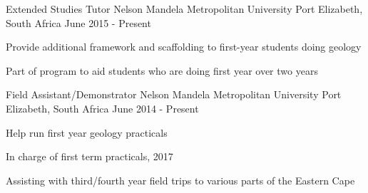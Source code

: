 


\begin{cventries}


\cventry
{Extended Studies Tutor} %
{Nelson Mandela Metropolitan University} %
{Port Elizabeth, South Africa} %
{June 2015 - Present} %
{ %
\begin{cvitems}
\item {Provide additional framework and scaffolding to first-year students doing geology}
\item {Part of program to aid students who are doing first year over two years}
\end{cvitems}
}


\cventry
{Field Assistant/Demonstrator} %
{Nelson Mandela Metropolitan University} %
{Port Elizabeth, South Africa} %
{June 2014 - Present} %
{ %
\begin{cvitems}
\item {Help run first year geology practicals}
\item {In charge of first term practicals, 2017}
\item {Assisting with third/fourth year field trips to various parts of the Eastern Cape}
\end{cvitems}
}



\end{cventries}
